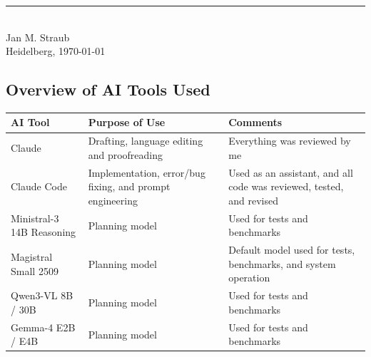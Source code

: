 \documentclass[
     12pt,
     a4paper,
     BCOR=10mm,
     DIV=14,
     listof=totoc,
     bibliography=totoc,
     parskip,
     twoside,
     headsepline
     ]{scrreprt}
\begin{document}
\vspace{1.5em}

\begin{flushright}
	\begin{minipage}{20em}
		\rule{\textwidth}{0.5pt}\\
		Jan M. Straub \\
		Heidelberg, \today
	\end{minipage}
\end{flushright}

\clearpage

\vspace*{30pt}

\subsection*{Overview of AI Tools Used}

\begin{tabularx}{\textwidth}{>{\raggedright\arraybackslash}X >{\raggedright\arraybackslash}X >{\raggedright\arraybackslash}X}
	\toprule
	\textbf{AI Tool}          & \textbf{Purpose of Use}                                  & \textbf{Comments}                                                    \\
	\midrule
	Claude                    & Drafting, language editing and proofreading              & Everything was reviewed by me                                        \\
	Claude Code               & Implementation, error/bug fixing, and prompt engineering & Used as an assistant, and all code was reviewed, tested, and revised \\
	Ministral-3 14B Reasoning & Planning model                                           & Used for tests and benchmarks                                        \\
	Magistral Small 2509      & Planning model                                           & Default model used for tests, benchmarks, and system operation       \\
	Qwen3-VL 8B / 30B         & Planning model                                           & Used for tests and benchmarks                                        \\
	Gemma-4 E2B / E4B         & Planning model                                           & Used for tests and benchmarks                                        \\
	\bottomrule
\end{tabularx}
\end{document}
